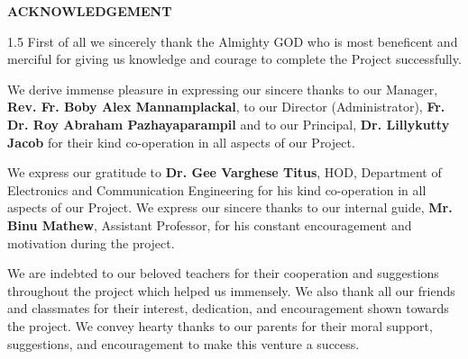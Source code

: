 \newpage
\thispagestyle{fancy}
\begin{center}
\vspace*{0.2cm}
{\Large\textbf{ACKNOWLEDGEMENT}}
\end{center}
\vspace{0.8cm}

\noindent
\begin{spacing}{1.5}
First of all we sincerely thank the Almighty GOD who is most beneficent and merciful for giving us knowledge and courage to complete the Project successfully.

We derive immense pleasure in expressing our sincere thanks to our Manager, \textbf{Rev. Fr. Boby Alex Mannamplackal}, to our Director (Administrator), \textbf{Fr. Dr. Roy Abraham Pazhayaparampil} and to our Principal, \textbf{Dr. Lillykutty Jacob} for their kind co-operation in all aspects of our Project.

We express our gratitude to \textbf{Dr. Gee Varghese Titus}, HOD, Department of Electronics and Communication Engineering for his kind co-operation in all aspects of our Project. We express our sincere thanks to our internal guide, \textbf{Mr. Binu Mathew}, Assistant Professor, for his constant encouragement and motivation during the project.

We are indebted to our beloved teachers for their cooperation and suggestions throughout the project which helped us immensely. We also thank all our friends and classmates for their interest, dedication, and encouragement shown towards the project. We convey hearty thanks to our parents for their moral support, suggestions, and encouragement to make this venture a success.
\end{spacing}
